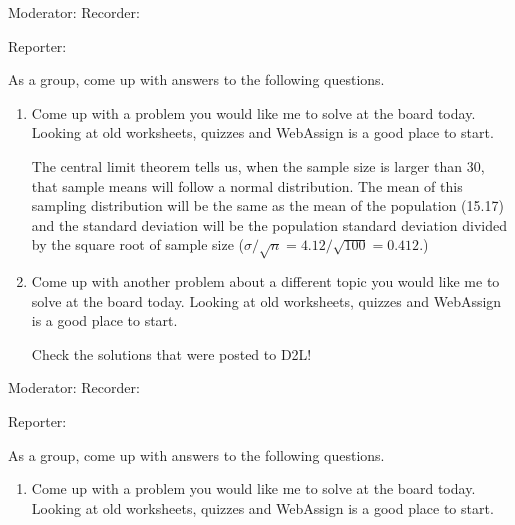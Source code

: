 \documentclass{article}
\newcommand{\answer}[1]{\color{red}#1}
\begin{document}
{{{Moderator:{\underbar{\hspace{2in}}} \hfill  Recorder:{\underbar{\hspace{2in}}}

\bigskip

Reporter:{\underbar{\hspace{2in}}}

As a group, come up with answers to the following questions.

\begin{enumerate} 

\item Come up with a problem you would like me to solve at the board today. Looking at old worksheets, quizzes and WebAssign is a good place to start.

{\answer The central limit theorem tells us, when the sample size is larger than 30, that sample means will follow a normal distribution. The mean of this sampling distribution will be the same as the mean of the population (15.17) and the standard deviation will be the population standard deviation divided by the square root of sample size ($\sigma/\sqrt{n} = 4.12/\sqrt{100} = 0.412$.)}

\item Come up with another problem about a different topic you would like me to solve at the board today. Looking at old worksheets, quizzes and WebAssign is a good place to start. 

{\answer Check the solutions that were posted to D2L!}

\end{enumerate}



\begin{center}
\textbf{}
\end{center}

Moderator:{\underbar{\hspace{2in}}} \hfill  Recorder:{\underbar{\hspace{2in}}}

\bigskip

Reporter:{\underbar{\hspace{2in}}}

As a group, come up with answers to the following questions.

\begin{enumerate} 

\item Come up with a problem you would like me to solve at the board today. Looking at old worksheets, quizzes and WebAssign is a good place to start.


\end{enumerate}}}}
\end{document}
